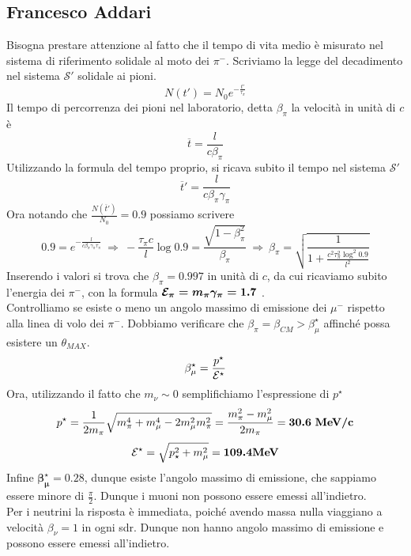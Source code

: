 \documentclass[12pt,twoside,a4]{article}
\begin{document}
\newpage
\subsection{Francesco Addari}
\begin{solution}
	Bisogna prestare attenzione al fatto che il tempo di vita medio è misurato nel sistema di riferimento solidale al moto dei $\pi^-$. Scriviamo la legge del decadimento nel sistema $\mathcal{S}'$ solidale ai pioni.
$$ N(t') = N_0 e^{- \frac{t'}{\tau_\pi}} $$
Il tempo di percorrenza dei pioni nel laboratorio, detta $\beta_\pi$ la velocità  in unità  di $c$ è
$$ \overline{t} = \frac{l}{c \beta_\pi} $$
Utilizzando la formula del tempo proprio, si ricava subito il tempo nel sistema $\mathcal{S}'$
$$ \overline{t}' = \frac{l}{c \beta_\pi \gamma_\pi} $$
Ora notando che $\frac{N(\overline{t}')}{N_0} = 0.9$ possiamo scrivere
$$ 0.9 = e^{-\frac{l}{c \beta_\pi \gamma_\pi \tau_\pi}}  \  \Rightarrow  \  
- \frac{\tau_\pi c}{l} \log 0.9 = \frac{\sqrt{1 - \beta_\pi^2}}{\beta_\pi}   \  \Rightarrow  \  
\beta_\pi = \sqrt{\frac{1}{1 + \frac{c^2 \tau_\pi^2 \log^2 0.9}{l^2}}} $$
Inserendo i valori si trova che $\beta_\pi = 0.997$ in unità  di $c$, da cui ricaviamo subito l'energia dei $\pi^-$, con la formula $\boldsymbol{\mathcal{E}_\pi = m_\pi \gamma_\pi = 1.7}$ .
\\
Controlliamo se esiste o meno un angolo massimo di emissione dei $\mu^-$ rispetto alla linea di volo dei $\pi^-$. Dobbiamo verificare che $\beta_\pi = \beta_{CM} > \beta_\mu^\star$ affinché possa esistere un $\theta_{MAX}$.
$$ \beta_\mu^\star = \frac{p^\star}{\mathcal{E}^\star}$$
Ora, utilizzando il fatto che $m_\nu \sim 0$ semplifichiamo l'espressione di $p^\star$ 
$$ p^\star = \frac{1}{2 m_\pi} \sqrt{m_\pi^4 + m_\mu^4 -2 m_\mu^2 m_\pi^2} = \frac{m_\pi^2 - m_\mu^2}{2 m_\pi} = \boldsymbol{30.6 \ \mathbf{{\mathrm{MeV}/c}}}$$
$$ \mathcal{E}^\star = \sqrt{p_\star^2 + m_\mu^2} = \boldsymbol{109.4  \mathbf{\mathrm{MeV}}}$$
Infine $\boldsymbol{\beta_\mu^\star = 0.28}$, dunque esiste l'angolo massimo di emissione, che sappiamo essere minore di $\frac{\pi}{2}$. Dunque i muoni non possono essere emessi all'indietro. 
\\
Per i neutrini la risposta è immediata, poiché avendo massa nulla viaggiano a velocità  $\beta_\nu = 1$ in ogni sdr. Dunque non hanno angolo massimo di emissione e possono essere emessi all'indietro.
\end{solution}
\newpage
\end{document}

